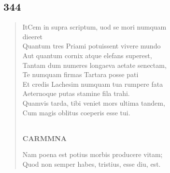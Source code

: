 \documentclass[11pt, a4paper]{report}
\begin{document}
            \subsection*{344}
      \begin{verse}
      ItCem in supra scriptum, uod se mori numquam \\ dieeret \\ Quantum tres Priami potuissent vivere mundo \\ Aut quantum cornix atque elefans superest, \\ Tantam dum numeres longaeva aetate senectam, \\ Te numquam firmas Tartara posse pati \\ Et credis Lachesim numquam tua rumpere fata \\ Aeternoque putas stamine fila trahi. \\ Quamvis tarda, tibi veniet mors ultima tandem, \\ Cum magis oblitus coeperis esse tui. \\ 
        ﻿\pagebreak 
    \begin{center} \textbf{CARMMNA} \end{center} \marginpar{[4]} Nam poena est potius morbis producere vitam; \\ Quod non semper habes, tristius, esse diu, est. \\ 
      \end{verse}
  
\end{document}
